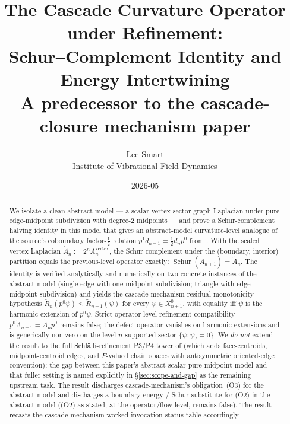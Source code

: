 \documentclass[11pt]{article}
\title{The Cascade Curvature Operator under Refinement: \\
Schur--Complement Identity and Energy Intertwining \\[0.4em]
\large A predecessor to the cascade-closure mechanism paper}
\author{Lee Smart \\ Institute of Vibrational Field Dynamics}
\date{2026-05}
\theoremstyle{plain}
\theoremstyle{definition}
\theoremstyle{remark}
\newcommand{\Schur}{\operatorname{Schur}}
\begin{document}
\maketitle

\begin{abstract}
We isolate a clean abstract model --- a scalar vertex-sector graph
Laplacian under pure edge-midpoint subdivision with degree-$2$
midpoints --- and prove a Schur-complement halving identity in this
model that gives an abstract-model curvature-level analogue of the
source's coboundary factor-$\tfrac12$ relation
$p^{1} d_{n+1} = \tfrac12 d_n p^{0}$ from
\cite{CascadeClosureDynamics}. With the
scaled vertex Laplacian $\widetilde A_n := 2^n A_n^{\mathrm{vertex}}$,
the Schur complement under the (boundary, interior) partition equals
the previous-level operator exactly:
$\Schur(\widetilde A_{n+1}) = \widetilde A_n$. The identity is
verified analytically and numerically on two concrete instances of
the abstract model (single edge with one-midpoint subdivision;
triangle with edge-midpoint subdivision) and yields the
cascade-mechanism residual-monotonicity hypothesis
$\widetilde R_n(p^{0} \psi) \le \widetilde R_{n+1}(\psi)$ for every
$\psi \in X_{n+1}^{0}$, with equality iff $\psi$ is the harmonic
extension of $p^{0} \psi$. Strict
operator-level refinement-compatibility
$p^{0} \widetilde A_{n+1} = \widetilde A_n p^{0}$ remains false; the
defect operator vanishes on harmonic extensions and is generically
non-zero on the level-$n$-supported sector
$\{\psi : \psi_I = 0\}$. We \emph{do not} extend the result to the
full Schl\"{a}fli-refinement P3/P4 tower of
\cite{CascadeRefinementSpaces, CascadeClosureDynamics} (which adds
face-centroids, midpoint-centroid edges, and $F$-valued chain
spaces with antisymmetric oriented-edge convention); the gap between
this paper's abstract scalar pure-midpoint model and that fuller
setting is named explicitly in \S\ref{sec:scope-and-gap} as the
remaining upstream task. The result discharges
cascade-mechanism's obligation~(O3) for the abstract model and
discharges a boundary-energy / Schur substitute for (O2) in the
abstract model ((O2) as stated, at the operator/flow level, remains
false). The result recasts the cascade-mechanism worked-invocation
status table accordingly.
\end{abstract}
\end{document}
